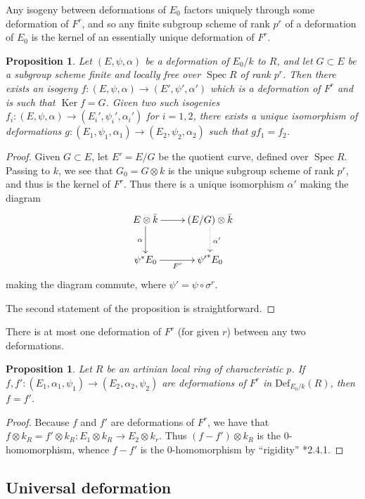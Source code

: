 \documentclass[11pt]{amsart}
\numberwithin{equation}{section}
\theoremstyle{plain}
\newtheorem{prop}[subsection]{Proposition}
\theoremstyle{remark}
\theoremstyle{plain}
\begin{document}
Any isogeny between deformations of $E_0$ factors uniquely through some
deformation of $F^r$, and so any finite subgroup scheme of rank $p^r$ of a
deformation of $E_0$ is the kernel of an essentially unique
deformation of $F^r$.
\begin{prop}
Let $(E,\psi,\alpha)$ be a deformation of $E_0/k$ to $R$, and let
$G\subset E$ be a subgroup scheme finite and locally free over ${\operatorname{Spec}} R$ of
rank $p^r$.  Then there exists an isogeny $f\colon
(E,\psi,\alpha){\rightarrow} (E',\psi',\alpha')$ which is a deformation of $F^r$
and is such that $\operatorname{Ker} f=G$.
Given two such isogenies $f_i\colon (E,\psi,\alpha){\rightarrow}
(E_i',\psi_i',\alpha_i')$ for $i=1,2$, there exists a unique
isomorphism of deformations $g\colon (E_1,\psi_1,\alpha_1){\rightarrow}
(E_2,\psi_2,\alpha_2)$ such that $gf_1=f_2$.
\end{prop}
\begin{proof}
Given $G\subset E$, let $E'=E/G$ be the quotient curve, defined over
${\operatorname{Spec}} R$.  Passing to $k$, we see that $G_0=G\otimes k$
is the unique subgroup scheme of rank $p^r$, and thus is the kernel of
$F^r$.  Thus 
there is a unique isomorphism
$\alpha'$ making the diagram
\[\xymatrix{
{E\otimes \bar{k}} \ar[r] \ar[d]_{\alpha}
& {(E/G)\otimes \bar{k}} \ar@{.>}[d]^{\alpha'}
\\
{\psi^*E_0} \ar[r]_{F^r}
& {{\psi'}^*E_0}
}\]
making the diagram commute, where $\psi'=\psi\circ \sigma^r$.

The second statement of the proposition is straightforward.
\end{proof}

There is at most one deformation of $F^r$ (for given $r$) between any
two deformations.
\begin{prop}\label{prop:def-of-frob-is-unique}
Let $R$ be an artinian local ring of characteristic $p$.  If
$f,f'\colon (E_1,\alpha_1,\psi_1){\rightarrow} (E_2,\alpha_2,\psi_2)$ are
deformations of $F^r$ in ${\mathrm{Def}}_{E_0/k}(R)$, then $f=f'$.
\end{prop}
\begin{proof}
Because $f$ and $f'$ are deformations of $F^r$, we have that $f\otimes
k_R=f'\otimes k_R\colon E_1\otimes k_R{\rightarrow} E_2\otimes k_r$.  Thus
$(f-f')\otimes k_R$ is the $0$-homomorphism, whence $f-f'$ is the
$0$-homomorphism by ``rigidity'' \cite{katz-mazur}*{2.4.1}.
\end{proof}

\subsection{Universal deformation}
\end{document}

